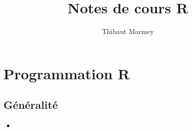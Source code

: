 \documentclass[12pt,a4paper]{article}
\author{Thibaut Marmey}
\title{Notes de cours R}
\begin{document}
	\maketitle

\begin{normalsize}
\tableofcontents
\end{normalsize}

\section{Programmation R}
\subsection{Généralité}
\begin{itemize}
\item 
\end{itemize}
\end{document}
